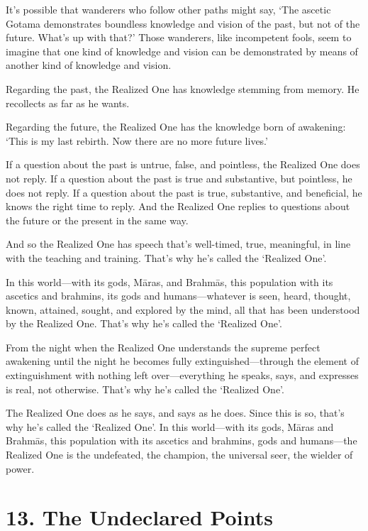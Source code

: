 \documentclass[12pt,openany]{book}%
\begin{document}
It’s possible that wanderers who follow other paths might say, ‘The ascetic Gotama demonstrates boundless knowledge and vision of the past, but not of the future. What’s up with that?’ Those wanderers, like incompetent fools, seem to imagine that one kind of knowledge and vision can be demonstrated by means of another kind of knowledge and vision. 

Regarding the past, the Realized One has knowledge stemming from memory. He recollects as far as he wants. 

Regarding the future, the Realized One has the knowledge born of awakening: ‘This is my last rebirth. Now there are no more future lives.’ 

If a question about the past is untrue, false, and pointless, the Realized One does not reply. If a question about the past is true and substantive, but pointless, he does not reply. If a question about the past is true, substantive, and beneficial, he knows the right time to reply. And the Realized One replies to questions about the future or the present in the same way. 

And so the Realized One has speech that’s well-timed, true, meaningful, in line with the teaching and training. That’s why he’s called the ‘Realized One’. 

In this world—with its gods, \textsanskrit{Māras}, and \textsanskrit{Brahmās}, this population with its ascetics and brahmins, its gods and humans—whatever is seen, heard, thought, known, attained, sought, and explored by the mind, all that has been understood by the Realized One. That’s why he’s called the ‘Realized One’. 

From the night when the Realized One understands the supreme perfect awakening until the night he becomes fully extinguished—through the element of extinguishment with nothing left over—everything he speaks, says, and expresses is real, not otherwise. That’s why he’s called the ‘Realized One’. 

The Realized One does as he says, and says as he does. Since this is so, that’s why he’s called the ‘Realized One’. In this world—with its gods, \textsanskrit{Māras} and \textsanskrit{Brahmās}, this population with its ascetics and brahmins, gods and humans—the Realized One is the undefeated, the champion, the universal seer, the wielder of power. 

\section*{13. The Undeclared Points }
\end{document}
